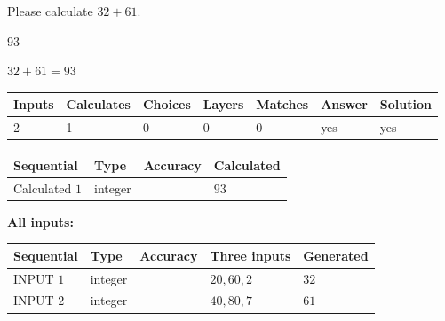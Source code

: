 \documentclass[12pt]{article}
\begin{document}
  
 
Please calculate $ %
32 +  %
61 $.
 
 
 
\noindent{}
 
 

93
 
 
\noindent{}
 
 

 
 
 
\noindent{}
 
 

$ %
32 +  %
61=   %
93$
 
 
\noindent{}
 
 

 
   
   
   
   
\noindent\begin{tabular}{|l|l|l|l|l|l|l|}
 \hline
Inputs & Calculates & Choices & Layers & Matches & Answer & Solution \\ \hline
 2  & 
 1  & 
 0
  & 
 0  & 
 0  & 
  yes & 
  yes 
  \\ \hline
 \end{tabular}
   
   
   
   
\noindent{}
   
   
  
  
\noindent\begin{tabular}{|l|l|l|l|}
\hline
 Sequential & Type & Accuracy & Calculated \\ 
\hline
 
 
  Calculated $  1 $ & integer &  & 
  $ 93 $ 
 \\  \hline  
 \end{tabular}
   
   
   
   
\noindent\vspace{0.1in}\hspace{-0.08in} {\textbf{\Large{All inputs: }}}
   
   
  
  
\noindent\begin{tabular}{|l|l|l|l|l|}
\hline
 Sequential & Type & Accuracy & Three inputs & Generated \\ 
\hline
 
 
  INPUT $  1 $ & integer &  & $
 20
 , 
 60
 , 
 2
 $ & $ 32 $ 
 \\  \hline  
 
 
  INPUT $  2 $ & integer &  & $
 40
 , 
 80
 , 
 7
 $ & $ 61 $ 
 \\  \hline  
 \end{tabular}
   
\end{document}
